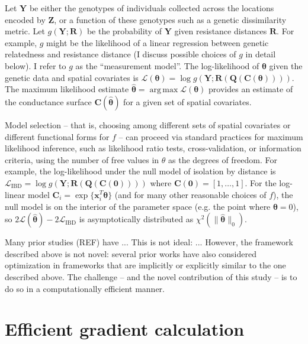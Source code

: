 \documentclass[11pt]{article}
\DeclareMathOperator*{\argmax}{arg\,max}
\newcommand{\mat}[1]{\mathbf{#1}}
\begin{document}
Let $\mat Y$ be either the genotypes of individuals collected across the
locations encoded by $\mat Z$, or a function of these genotypes such as a
genetic dissimilarity metric. Let $g(\mat Y; \mat R)$ be the probability of
$\mat Y$ given resistance distances $\mat R$. For example, $g$ might be the
likelihood of a linear regression between genetic relatedness and resistance
distance (I discuss possible choices of $g$ in detail below). I refer to $g$ as
the ``measurement model''. The log-likelihood of $\bm \theta$ given the genetic
data and spatial covariates is $\mathcal{L}(\bm \theta) = \log g(\mat Y; \mat
R(\mat Q(\mat C(\bm \theta))))$.  The maximum likelihood estimate $\hat{\bm
  \theta} = \argmax \mathcal{L}(\bm \theta)$ provides an estimate of the
conductance surface $\mat C(\hat{\bm \theta})$ for a given set of spatial
covariates. 

Model selection -- that is, choosing among different sets of spatial covariates
or different functional forms for $f$ -- can proceed via standard practices for
maximum likelihood inference, such as likelihood ratio tests, cross-validation,
or information criteria, using the number of free values in $\theta$ as the
degrees of freedom. For example, the log-likelihood under the null model of
isolation by distance is $\mathcal{L}_{\mathrm{IBD}} = \log g(\mat Y; \mat
R(\mat Q(\mat C(\mat 0))))$ where $\mat C(\mat 0) = [1, \dots, 1]$. For the
log-linear model $\mat C_i = \exp \{ \mat x_i^T \bm \theta \}$ (and for many other
reasonable choices of $f$), the null model is on the interior of the parameter
space (e.g. the point where $\bm \theta = 0$), so $2 \mathcal{L} (\hat{\bm \theta}) -
2 \mathcal{L}_\mathrm{IBD}$ is asymptotically distributed as 
$\chi^2(\| \bm{\hat \theta} \|_0)$.

Many prior studies (REF) have ... This is not ideal: ... However, the framework
described above is not novel: several prior works have also considered
optimization in frameworks that are implicitly or explicitly similar to the one
described above. The challenge -- and the novel contribution of this study --
is to do so in a computationally efficient manner.


\section{Efficient gradient calculation}
\end{document}
